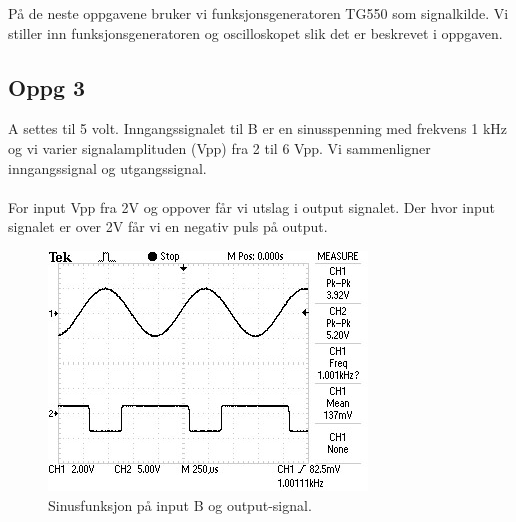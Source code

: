 På de neste oppgavene bruker vi funksjonsgeneratoren TG550 som signalkilde.
Vi stiller inn funksjonsgeneratoren og oscilloskopet slik det er
beskrevet i oppgaven.

\subsection{Oppg 3}
A settes til 5 volt.  
Inngangssignalet til B er en sinusspenning med frekvens 1 kHz og vi varier
signalamplituden (Vpp) fra 2 til 6 Vpp. 
Vi sammenligner inngangssignal og utgangssignal.
\\\\
For input Vpp fra 2V og oppover får vi utslag i output signalet.
Der hvor input signalet er over 2V får vi en negativ puls på output.
\begin{figure}[H]
  \caption{Sinusfunksjon på input B og output-signal.}
  \centering
    \includegraphics[width=\textwidth]{3.jpg}
\end{figure}
